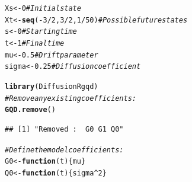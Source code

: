 \documentclass[a4paper,11pt]{article}\usepackage[]{graphicx}\usepackage[]{color}
\makeatletter
\newcommand{\hlnum}[1]{\textcolor[rgb]{0.686,0.059,0.569}{#1}}%
\newcommand{\hlcom}[1]{\textcolor[rgb]{0.678,0.584,0.686}{\textit{#1}}}%
\newcommand{\hlopt}[1]{\textcolor[rgb]{0,0,0}{#1}}%
\newcommand{\hlstd}[1]{\textcolor[rgb]{0.345,0.345,0.345}{#1}}%
\newcommand{\hlkwa}[1]{\textcolor[rgb]{0.161,0.373,0.58}{\textbf{#1}}}%
\newcommand{\hlkwb}[1]{\textcolor[rgb]{0.69,0.353,0.396}{#1}}%
\newcommand{\hlkwc}[1]{\textcolor[rgb]{0.333,0.667,0.333}{#1}}%
\newcommand{\hlkwd}[1]{\textcolor[rgb]{0.737,0.353,0.396}{\textbf{#1}}}%
\newenvironment{kframe}{%
 \def\at@end@of@kframe{}%
 \ifinner\ifhmode%
  \def\at@end@of@kframe{\end{minipage}}%
  \begin{minipage}{\columnwidth}%
 \fi\fi%
 \def\FrameCommand##1{\hskip\@totalleftmargin \hskip-\fboxsep
 \colorbox{shadecolor}{##1}\hskip-\fboxsep
     \hskip-\linewidth \hskip-\@totalleftmargin \hskip\columnwidth}%
 \MakeFramed {\advance\hsize-\width
   \@totalleftmargin\z@ \linewidth\hsize
   \@setminipage}}%
 {\par\unskip\endMakeFramed%
 \at@end@of@kframe}
\newenvironment{knitrout}{}{} %
\makeatother
\begin{document}
\begin{knitrout}
\color{fgcolor}\begin{kframe}
\begin{alltt}
\hlstd{Xs} \hlkwb{<-} \hlnum{0}                 \hlcom{# Initial state}
\hlstd{Xt} \hlkwb{<-} \hlkwd{seq}\hlstd{(}\hlopt{-}\hlnum{3}\hlopt{/}\hlnum{2}\hlstd{,}\hlnum{3}\hlopt{/}\hlnum{2}\hlstd{,}\hlnum{1}\hlopt{/}\hlnum{50}\hlstd{)}\hlcom{# Possible future states}
\hlstd{s}  \hlkwb{<-} \hlnum{0}                 \hlcom{# Starting time}
\hlstd{t}  \hlkwb{<-} \hlnum{1}                 \hlcom{# Final time}
\hlstd{mu}    \hlkwb{<-} \hlnum{0.5}            \hlcom{# Drift parameter}
\hlstd{sigma} \hlkwb{<-} \hlnum{0.25}           \hlcom{# Diffusion coefficient}

\hlkwd{library}\hlstd{(DiffusionRgqd)}
\hlcom{# Remove any existing coefficients:}
\hlkwd{GQD.remove}\hlstd{()}
\end{alltt}
\begin{verbatim}
## [1] "Removed :  G0 G1 Q0"
\end{verbatim}
\begin{alltt}
\hlcom{# Define the model coefficients:}
\hlstd{G0} \hlkwb{<-} \hlkwa{function}\hlstd{(}\hlkwc{t}\hlstd{)\{mu\}}
\hlstd{Q0} \hlkwb{<-} \hlkwa{function}\hlstd{(}\hlkwc{t}\hlstd{)\{sigma}\hlopt{^}\hlnum{2}\hlstd{\}}


\end{alltt}
\end{kframe}
\end{knitrout}
\end{document}
